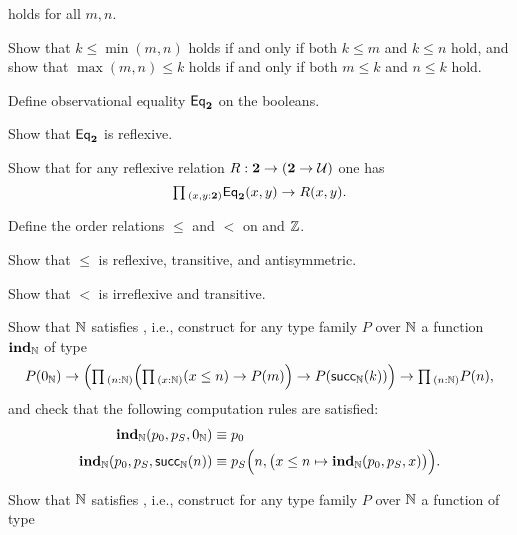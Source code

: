 \begin{exercises}
\begin{subexenum}
    holds for all $m,n$.
  \item Show that $k\leq \min(m,n)$ holds if and only if both $k\leq m$ and $k\leq n$ hold, and show that $\max(m,n)\leq k$ holds if and only if both $m\leq k$ and $n\leq k$ hold.
  \end{subexenum}
\exercise \label{ex:obs_bool}
  \begin{subexenum}
  \item Define observational equality $\mathsf{Eq}_\mathbf{2}$ on the booleans.
  \item Show that $\mathsf{Eq}_\mathbf{2}$ is reflexive.
  \item Show that for any reflexive relation $R:\mathbf{2}\to(\mathbf{2}\to \mathcal{U})$ one has
    \begin{equation*}
      \prd{x,y:\bool} \EqBool(x,y)\to R(x,y).
    \end{equation*}
  \end{subexenum}
\exercise \label{ex:int_order}
  \begin{subexenum}
  \item Define the order relations $\leq$ and $<$ on and ${\mathbb{Z}}$.
  \item Show that $\leq$ is reflexive, transitive, and antisymmetric.
  \item Show that $<$ is irreflexive and transitive.
  \end{subexenum}
\exercise
  \begin{subexenum}
  \item \label{ex:strong-induction}Show that ${\mathbb{N}}$ satisfies , i.e., construct for any type family $P$ over ${\mathbb{N}}$ a function $\mathbf{ind}_{\mathbb{N}}$ of type
    \begin{equation*}
       P(\zeroN) \to \Big(\prd{n:\N}\Big(\prd{x:\N} (x\leq n) \to P(m)\Big)\to P(\succN(k))\Big) \to \prd{n:\N}P(n),
    \end{equation*}
    and check that the following computation rules are satisfied:
    \begin{align*}
      \mathbf{ind}_{\mathbb{N}}(p_0,p_S,0_{{\mathbb{N}}}) & \equiv p_0 \\
      \mathbf{ind}_{\mathbb{N}}(p_0,p_S,\mathsf{succ}_{{\mathbb{N}}}(n)) & \equiv p_S\Big(n,\big(x\leq n\mapsto\mathbf{ind}_{\mathbb{N}}(p_0,p_S,x)\big)\Big).
    \end{align*}
  \item Show that ${\mathbb{N}}$ satisfies , i.e., construct for any type family $P$ over ${\mathbb{N}}$ a function of type

\end{subexenum}
\end{exercises}
